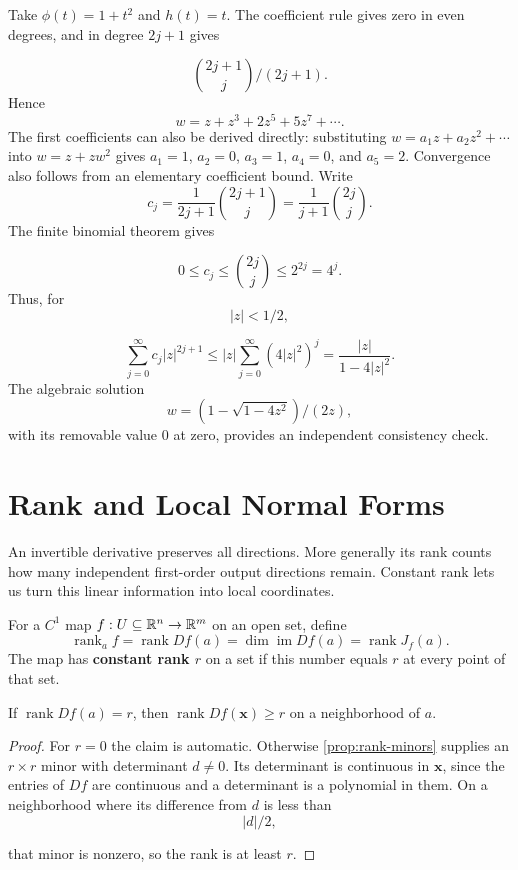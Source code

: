 \begin{example}
Take $\phi(t)=1+t^2$ and $h(t)=t$. The coefficient rule gives zero in
even degrees, and in degree $2j+1$ gives

\[
\binom{2j+1}{j}/(2j+1).
\]
 Hence
\[
w=z+z^3+2z^5+5z^7+\cdots.
\]
The first coefficients can also be derived directly: substituting
$w=a_1z+a_2z^2+\cdots$ into $w=z+zw^2$ gives
$a_1=1$, $a_2=0$, $a_3=1$, $a_4=0$, and $a_5=2$.
Convergence also follows from an elementary coefficient bound. Write
\[
c_j=\frac{1}{2j+1}\binom{2j+1}{j}
=\frac{1}{j+1}\binom{2j}{j}.
\]
The finite binomial theorem gives

\[
0\leq c_j\leq\binom{2j}{j}\leq 2^{2j}=4^j.
\]
 Thus, for
\[
|z|<1/2,
\]

\[
\sum_{j=0}^{\infty}c_j|z|^{2j+1}
\leq |z|\sum_{j=0}^{\infty}(4|z|^2)^j
=\frac{|z|}{1-4|z|^2}.
\]
The algebraic solution
\[
w=(1-\sqrt{1-4z^2})/(2z),
\]
 with its removable
value $0$ at zero, provides an independent consistency check.
\end{example}

\section{Rank and Local Normal Forms}
\label{sec:rank-normal-forms}
An invertible derivative preserves all directions. More generally its
rank counts how many independent first-order output directions remain.
Constant rank lets us turn this linear information into local coordinates.

\begin{definition}\label{def:map-rank}
For a $C^1$ map $f:U\subseteq\mathbb{R}^n\to\mathbb{R}^m$ on an open set, define
\[
\operatorname{rank}_a f=\operatorname{rank}Df(a)
=\dim\operatorname{im}Df(a)=\operatorname{rank}J_f(a).
\]
The map has \textbf{constant rank $r$} on a set if this number equals $r$
at every point of that set.
\end{definition}
\begin{lemma}\label{lem:rank-persistence}
If $\operatorname{rank}Df(a)=r$, then $\operatorname{rank}Df(\mathbf{x})\geq r$
on a neighborhood of $a$.
\end{lemma}
\begin{proof}
For $r=0$ the claim is automatic. Otherwise \cref{prop:rank-minors}
supplies an $r\times r$ minor with determinant $d\ne0$. Its determinant is continuous in $\mathbf{x}$, since the
entries of $Df$ are continuous and a determinant is a polynomial in them.
On a neighborhood where its difference from $d$ is less than
\[
|d|/2,
\]

that minor is nonzero, so the rank is at least $r$.
\end{proof}

